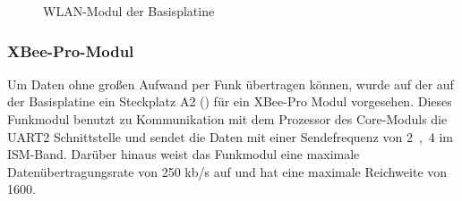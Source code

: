 \begin{figure}[H]
    \centering
    \qquad
    \qquad
    \caption[WLAN-Modul der Basisplatine]{WLAN-Modul der \gls{Basisplatine}}
    \label{fig:basisplatine-wlan}
\end{figure}

\subsubsection{XBee-Pro-Modul}
Um Daten ohne großen Aufwand per Funk übertragen können, wurde auf der auf der \gls{Basisplatine} ein Steckplatz A2 () für ein XBee-Pro Modul vorgesehen. Dieses Funkmodul benutzt zu Kommunikation mit dem Prozessor des \gls{Core-Modul}s die UART2 Schnittstelle und sendet die Daten mit einer Sendefrequenz von \unit{2,4}{\giga\hertz} im ISM-Band. Darüber hinaus weist das Funkmodul eine maximale Datenübertragungsrate von 250 kb/s auf und hat eine maximale Reichweite von \unit{1600}{\metre}.

